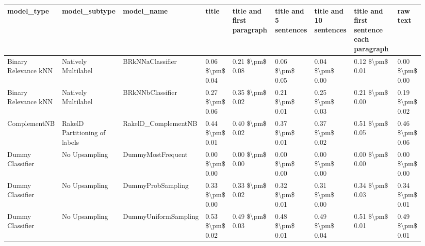 \begin{tabular}{lllllllll}
\toprule
                     model\_type &                 model\_subtype &                                   model\_name &           title & title and first paragraph & title and 5 sentences & title and 10 sentences & title and first sentence each paragraph &        raw text \\
\midrule
           Binary Relevance kNN &           Natively Multilabel &                             BRkNNaClassifier & 0.06 \$\textbackslash pm\$ 0.04 &           0.21 \$\textbackslash pm\$ 0.08 &       0.06 \$\textbackslash pm\$ 0.05 &        0.04 \$\textbackslash pm\$ 0.00 &                         0.12 \$\textbackslash pm\$ 0.01 & 0.00 \$\textbackslash pm\$ 0.00 \\
           Binary Relevance kNN &           Natively Multilabel &                             BRkNNbClassifier & 0.27 \$\textbackslash pm\$ 0.06 &           0.35 \$\textbackslash pm\$ 0.02 &       0.21 \$\textbackslash pm\$ 0.01 &        0.25 \$\textbackslash pm\$ 0.03 &                         0.21 \$\textbackslash pm\$ 0.00 & 0.19 \$\textbackslash pm\$ 0.02 \\
                   ComplementNB & RakelD Partitioning of labels &                          RakelD\_ComplementNB & 0.44 \$\textbackslash pm\$ 0.01 &           0.40 \$\textbackslash pm\$ 0.02 &       0.37 \$\textbackslash pm\$ 0.01 &        0.37 \$\textbackslash pm\$ 0.02 &                         0.51 \$\textbackslash pm\$ 0.05 & 0.46 \$\textbackslash pm\$ 0.06 \\
               Dummy Classifier &                 No Upsampling &                            DummyMostFrequent & 0.00 \$\textbackslash pm\$ 0.00 &           0.00 \$\textbackslash pm\$ 0.00 &       0.00 \$\textbackslash pm\$ 0.00 &        0.00 \$\textbackslash pm\$ 0.00 &                         0.00 \$\textbackslash pm\$ 0.00 & 0.00 \$\textbackslash pm\$ 0.00 \\
               Dummy Classifier &                 No Upsampling &                            DummyProbSampling & 0.33 \$\textbackslash pm\$ 0.00 &           0.33 \$\textbackslash pm\$ 0.02 &       0.32 \$\textbackslash pm\$ 0.01 &        0.31 \$\textbackslash pm\$ 0.00 &                         0.34 \$\textbackslash pm\$ 0.03 & 0.34 \$\textbackslash pm\$ 0.01 \\
               Dummy Classifier &                 No Upsampling &                         DummyUniformSampling & 0.53 \$\textbackslash pm\$ 0.02 &           0.49 \$\textbackslash pm\$ 0.03 &       0.48 \$\textbackslash pm\$ 0.01 &        0.49 \$\textbackslash pm\$ 0.04 &                         0.51 \$\textbackslash pm\$ 0.01 & 0.49 \$\textbackslash pm\$ 0.01 \\

\end{tabular}
